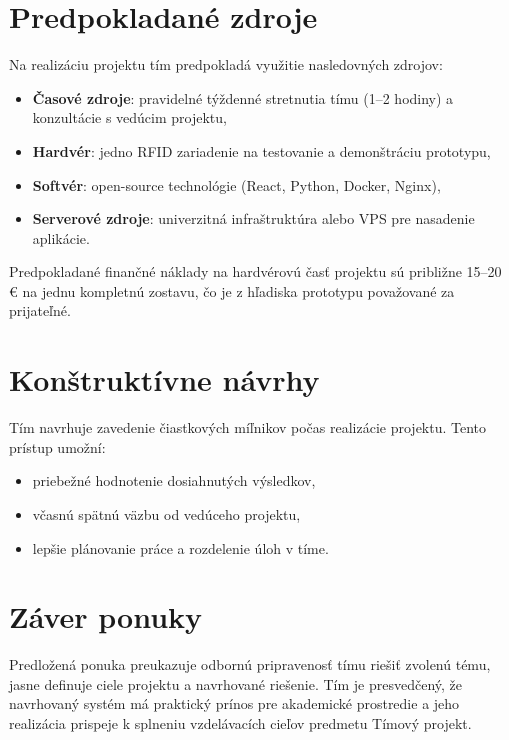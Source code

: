 \section{Predpokladané zdroje}

Na realizáciu projektu tím predpokladá využitie nasledovných zdrojov:

\begin{itemize}
    \item \textbf{Časové zdroje}: pravidelné týždenné stretnutia tímu (1–2 hodiny) a konzultácie s vedúcim projektu,
    \item \textbf{Hardvér}: jedno RFID zariadenie na testovanie a demonštráciu prototypu,
    \item \textbf{Softvér}: open-source technológie (React, Python, Docker, Nginx),
    \item \textbf{Serverové zdroje}: univerzitná infraštruktúra alebo VPS pre nasadenie aplikácie.
\end{itemize}

Predpokladané finančné náklady na hardvérovú časť projektu sú približne 15–20 € na jednu
kompletnú zostavu, čo je z hľadiska prototypu považované za prijateľné.

\section{Konštruktívne návrhy}

Tím navrhuje zavedenie čiastkových míľnikov počas realizácie projektu. Tento prístup umožní:
\begin{itemize}
    \item priebežné hodnotenie dosiahnutých výsledkov,
    \item včasnú spätnú väzbu od vedúceho projektu,
    \item lepšie plánovanie práce a rozdelenie úloh v tíme.
\end{itemize}

\section{Záver ponuky}

Predložená ponuka preukazuje odbornú pripravenosť tímu riešiť zvolenú tému,
jasne definuje ciele projektu a navrhované riešenie.
Tím je presvedčený, že navrhovaný systém má praktický prínos pre akademické prostredie
a jeho realizácia prispeje k splneniu vzdelávacích cieľov predmetu Tímový projekt.



